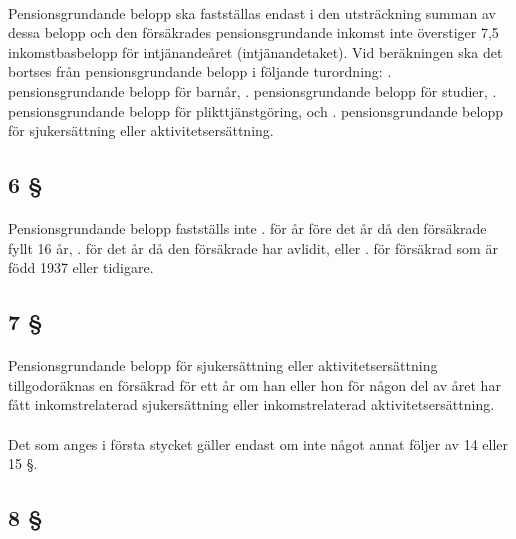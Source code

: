 \documentclass[a4paper,notitlepage,openany,10pt]{book}
\begin{document}
\paragraph*{}
Pensionsgrundande belopp ska fastställas endast i den utsträckning summan av dessa belopp och den försäkrades pensionsgrundande inkomst inte överstiger 7,5 inkomstbasbelopp för intjänandeåret (intjänandetaket). Vid beräkningen ska det bortses från pensionsgrundande belopp i följande turordning:
. pensionsgrundande belopp för barnår,
. pensionsgrundande belopp för studier,
. pensionsgrundande belopp för plikttjänstgöring, och
. pensionsgrundande belopp för sjukersättning eller aktivitetsersättning.
\subsection*{6 §}
\paragraph*{}
Pensionsgrundande belopp fastställs inte
. för år före det år då den försäkrade fyllt 16 år,
. för det år då den försäkrade har avlidit, eller
. för försäkrad som är född 1937 eller tidigare.
\subsection*{7 §}
\paragraph*{}
Pensionsgrundande belopp för sjukersättning eller aktivitetsersättning tillgodoräknas en försäkrad för ett år om han eller hon för någon del av året har fått inkomstrelaterad sjukersättning eller inkomstrelaterad aktivitetsersättning.
\paragraph*{}
Det som anges i första stycket gäller endast om inte något annat följer av 14 eller 15 §.
\subsection*{8 §}
\end{document}
